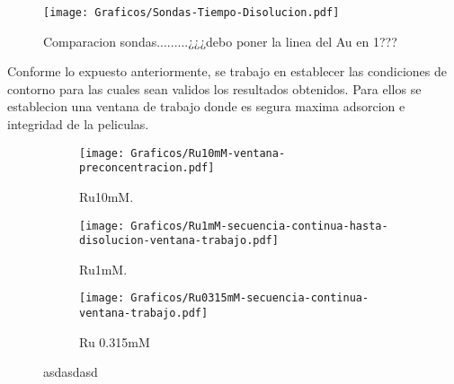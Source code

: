 
			\begin{figure}[ht]
				\centering
		 	    \texttt{[image: Graficos/Sondas-Tiempo-Disolucion.pdf]}
		        \caption[AAAAAAaa]{Comparacion sondas.........¿¿¿debo poner la linea del Au en 1???}
		      	\end{figure}

		Conforme lo expuesto anteriormente, se trabajo en establecer las condiciones de contorno para las cuales sean validos los resultados obtenidos. Para ellos se establecion una ventana de trabajo donde es segura maxima adsorcion e integridad de la peliculas.
			
			\begin{figure}[th]
	 	   	    \begin{subfigure}[t]{0.325\textwidth}
		        	\texttt{[image: Graficos/Ru10mM-ventana-preconcentracion.pdf]}
		       		\caption{Ru10mM.}
		         	\label{fig:Ventana_Ru10mM}
		     		\end{subfigure}
	     		\begin{subfigure}[t]{0.325\textwidth}
		        	\texttt{[image: Graficos/Ru1mM-secuencia-continua-hasta-disolucion-ventana-trabajo.pdf]}
		       		\caption{Ru1mM.}
		         	\label{fig:Ventana_Ru1mM}
		     		\end{subfigure}
	     		\begin{subfigure}[t]{0.325\textwidth}
		        	\texttt{[image: Graficos/Ru0315mM-secuencia-continua-ventana-trabajo.pdf]}
		       		\caption{Ru 0.315mM}
		         	\label{fig:Ventana_Ru0315mM}
		     		\end{subfigure}
	 	   	   	\caption[asdasdasd]{asdasdasd}
	     		\label{fig:ventana-trabajo}
	     	   	\end{figure}
    

